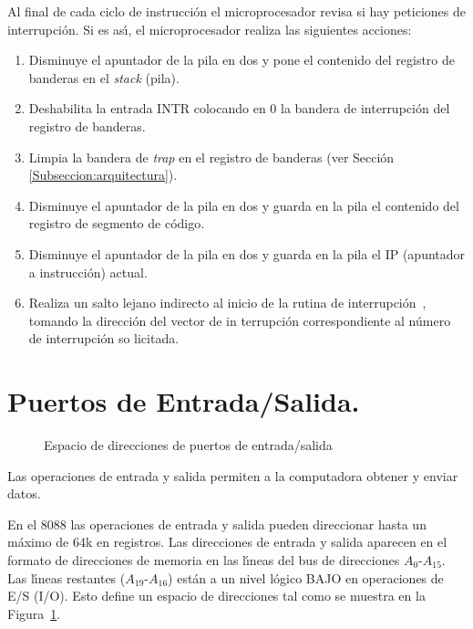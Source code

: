Al final de cada ciclo de instrucci\'on el microprocesador revisa si hay peticiones de %
interrupci\'on. Si es as\'{\i}, el microprocesador realiza las siguientes acciones:

\begin{enumerate}
\item Disminuye el apuntador de la pila en dos y pone el contenido del registro de banderas en %
el {\it stack} (pila).
\item Deshabilita la entrada INTR colocando en 0 la bandera de interrupci\'on del registro de %
banderas.
\item Limpia la bandera de {\em trap\/} en el registro de banderas (ver Secci\'on %
\ref{Subseccion:arquitectura}).
\item Disminuye el apuntador de la pila en dos y guarda en la pila el contenido del registro de %
segmento de c\'odigo.
\item Disminuye el apuntador de la pila en dos y guarda en la pila el IP (apuntador a %
instrucci\'on) actual.
\item Rea\-li\-za un sal\-to le\-ja\-no in\-di\-rec\-to al i\-ni\-cio de la ru\-ti\-na de %
in\-te\-rrup\-ci\'on~\cite{Hall}, to\-man\-do la di\-rec\-ci\-\'on del vec\-tor de in\-%
te\-rrup\-ci\'on co\-rres\-pon\-dien\-te al n\'u\-me\-ro de in\-te\-rrup\-ci\'on so\-%
li\-ci\-ta\-da.
\end{enumerate}


\section{Puertos de Entrada/Salida.}
\label{Section:puertos}

\begin{figure}[!htb]
\vskip 5mm
\vskip 70mm
\caption{Espacio de direcciones de puertos de entrada/salida} 
\label{Figura:puertosIO}
\end{figure}

Las operaciones de entrada y salida permiten a la computadora obtener y enviar datos.

En el 8088 las operaciones de entrada y salida pueden direccionar hasta un m\'aximo de 64k en %
registros. Las direcciones de entrada y salida aparecen en el formato de direcciones de memoria %
en las l\'{\i}neas del bus de direcciones $A_{0}$-$A_{15}$. Las l\'{\i}neas restantes %
($A_{19}$-$A_{16}$) est\'an a un nivel l\'ogico BAJO en operaciones de E/S (I/O). Esto define %
un espacio de direcciones tal como se muestra en la Figura~\ref{Figura:puertosIO}.

